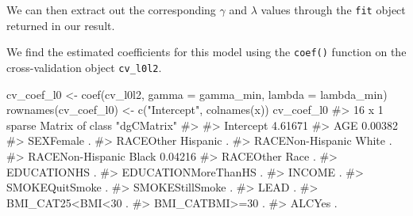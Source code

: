 \documentclass[
  letterpaper,
]{latex/krantz}
\makeatletter
\newenvironment{Shaded}{\begin{snugshade}}{\end{snugshade}}
\newcommand{\AttributeTok}[1]{\textcolor[rgb]{0.40,0.45,0.13}{#1}}
\newcommand{\CommentTok}[1]{\textcolor[rgb]{0.37,0.37,0.37}{#1}}
\newcommand{\DecValTok}[1]{\textcolor[rgb]{0.68,0.00,0.00}{#1}}
\newcommand{\FunctionTok}[1]{\textcolor[rgb]{0.28,0.35,0.67}{#1}}
\newcommand{\NormalTok}[1]{\textcolor[rgb]{0.00,0.23,0.31}{#1}}
\newcommand{\OtherTok}[1]{\textcolor[rgb]{0.00,0.23,0.31}{#1}}
\newcommand{\SpecialCharTok}[1]{\textcolor[rgb]{0.37,0.37,0.37}{#1}}
\newcommand{\StringTok}[1]{\textcolor[rgb]{0.13,0.47,0.30}{#1}}
\newenvironment{kframe}{%
\medskip{}
\setlength{\fboxsep}{.8em}
 \def\at@end@of@kframe{}%
 \ifinner\ifhmode%
  \def\at@end@of@kframe{\end{minipage}}%
  \begin{minipage}{\columnwidth}%
 \fi\fi%
 \def\FrameCommand##1{\hskip\@totalleftmargin \hskip-\fboxsep
 \colorbox{shadecolor}{##1}\hskip-\fboxsep
     \hskip-\linewidth \hskip-\@totalleftmargin \hskip\columnwidth}%
 \MakeFramed {\advance\hsize-\width
   \@totalleftmargin\z@ \linewidth\hsize
   \@setminipage}}%
 {\par\unskip\endMakeFramed%
 \at@end@of@kframe}
\renewenvironment{Shaded}{\begin{kframe}}{\end{kframe}}
\makeatother
\begin{document}
We can then extract out the corresponding \(\gamma\) and \(\lambda\)
values through the \texttt{fit} object returned in our result.

\begin{Shaded}
\end{Shaded}

We find the estimated coefficients for this model using the
\texttt{coef()} function on the cross-validation object
\texttt{cv\_l0l2}.

\begin{Shaded}
\begin{Highlighting}[]
\NormalTok{cv\_coef\_l0 }\OtherTok{\textless{}{-}} \FunctionTok{coef}\NormalTok{(cv\_l0l2, }\AttributeTok{gamma =}\NormalTok{ gamma\_min, }\AttributeTok{lambda =}\NormalTok{ lambda\_min)}
\FunctionTok{rownames}\NormalTok{(cv\_coef\_l0) }\OtherTok{\textless{}{-}} \FunctionTok{c}\NormalTok{(}\StringTok{"Intercept"}\NormalTok{, }\FunctionTok{colnames}\NormalTok{(x))}
\NormalTok{cv\_coef\_l0}
\CommentTok{\#\textgreater{} 16 x 1 sparse Matrix of class "dgCMatrix"}
\CommentTok{\#\textgreater{}                               }
\CommentTok{\#\textgreater{} Intercept              4.61671}
\CommentTok{\#\textgreater{} AGE                    0.00382}
\CommentTok{\#\textgreater{} SEXFemale              .      }
\CommentTok{\#\textgreater{} RACEOther Hispanic     .      }
\CommentTok{\#\textgreater{} RACENon{-}Hispanic White .      }
\CommentTok{\#\textgreater{} RACENon{-}Hispanic Black 0.04216}
\CommentTok{\#\textgreater{} RACEOther Race         .      }
\CommentTok{\#\textgreater{} EDUCATIONHS            .      }
\CommentTok{\#\textgreater{} EDUCATIONMoreThanHS    .      }
\CommentTok{\#\textgreater{} INCOME                 .      }
\CommentTok{\#\textgreater{} SMOKEQuitSmoke         .      }
\CommentTok{\#\textgreater{} SMOKEStillSmoke        .      }
\CommentTok{\#\textgreater{} LEAD                   .      }
\CommentTok{\#\textgreater{} BMI\_CAT25\textless{}BMI\textless{}30       .      }
\CommentTok{\#\textgreater{} BMI\_CATBMI\textgreater{}=30         .      }
\CommentTok{\#\textgreater{} ALCYes                 .}
\end{Highlighting}
\end{Shaded}
\end{document}
